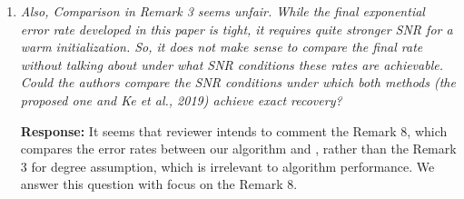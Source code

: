 \documentclass[11pt]{article}
\theoremstyle{definition}
\theoremstyle{definition}
\newcommand{\ang}[1]{\left\langle#1\right\rangle}
\def\fixme#1#2{\textbf{\color{red}[FIXME (#1): #2]}}
\begin{document}
\begin{enumerate}
\begin{enumerate}[wide]

        \item \textit{Also, Comparison in Remark 3 seems unfair. While the final exponential error rate developed in this paper is tight, it requires quite stronger SNR for a warm initialization. So, it does not make sense to compare the final rate without talking about under what SNR conditions these rates are achievable. Could the authors compare the SNR conditions under which both methods (the proposed one and Ke et al., 2019) achieve exact recovery?}

        \textbf{Response:} It seems that reviewer intends to comment the Remark 8, which compares the error rates between our algorithm and \cite{ke2019community}, rather than the Remark 3 for degree assumption, which is irrelevant to algorithm performance. We answer this question with focus on the Remark 8.
        

\end{enumerate}
\end{enumerate}
\end{document}
